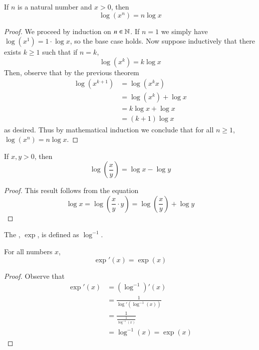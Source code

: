 \documentclass[12pt, a4paper, oneside, openright, titlepage]{book}
\begin{document}
\begin{subappendices}
    \begin{cor}
        If $n$ is a natural number and $x > 0$, then \begin{equation}
            \log(x^n) = n\log x
        \end{equation}
    \end{cor}
    \begin{proof}
        We proceed by induction on $n \in \mathbb N$. If $n = 1$ we simply have $\log(x^1) = 1\cdot \log x$, so the base case holds. Now suppose inductively that there exists $k \geq 1$ such that if $n = k$, \begin{equation*}
            \log(x^k) = k\log x
        \end{equation*}
        Then, observe that by the previous theorem \begin{align*}
            \log(x^{k+1}) &= \log(x^kx) \\
            &= \log(x^k) + \log x \\
            &= k\log x + \log x \tag{by the Induction Hypothesis} \\
            &= (k+1)\log x
        \end{align*}
        as desired. Thus by mathematical induction we conclude that for all $n \geq 1$, $\log(x^n) = n\log x$.
    \end{proof}


    \begin{cor}
        If $x,y > 0$, then \begin{equation*}
            \log\left(\frac{x}{y}\right) = \log x - \log y
        \end{equation*}
    \end{cor}
    \begin{proof}
        This result follows from the equation \begin{equation*}
            \log x = \log \left(\frac{x}{y}\cdot y\right) = \log\left(\frac{x}{y}\right) + \log y
        \end{equation*}
    \end{proof}

    \begin{defn}
        The , $\exp$, is defined as $\log^{-1}$.
    \end{defn}

    \begin{thm}
        For all numbers $x$,\begin{equation*}
            \exp'(x) = \exp(x)
        \end{equation*}
    \end{thm}
    \begin{proof}
        Observe that \begin{align*}
            \exp'(x) &= (\log^{-1})'(x) \\
            &= \frac{1}{\log'(\log^{-1}(x))} \\
            &= \frac{1}{\frac{1}{\log^{-1}(x)}} \\
            &= \log^{-1}(x) = \exp(x)
        \end{align*}
    \end{proof}


\end{subappendices}
\end{document}
